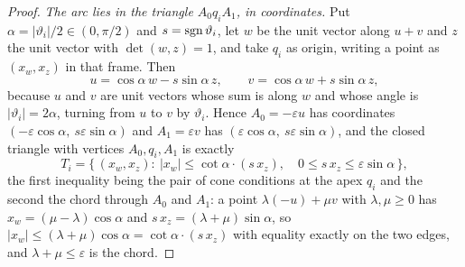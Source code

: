 \begin{proof}
\emph{The arc lies in the triangle $A_0q_iA_1$, in coordinates.} Put
$\alpha=|\vartheta_i|/2\in(0,\pi/2)$ and $s=\operatorname{sgn}\vartheta_i$, let $w$ be the unit vector
along $u+v$ and $z$ the unit vector with $\det(w,z)=1$, and take $q_i$ as
origin, writing a point as $(x_w,x_z)$ in that frame. Then
\[
   u=\cos\alpha\,w-s\sin\alpha\,z,
   \qquad
   v=\cos\alpha\,w+s\sin\alpha\,z,
\]
because $u$ and $v$ are unit vectors whose sum is along $w$ and whose angle is
$|\vartheta_i|=2\alpha$, turning from $u$ to $v$ by $\vartheta_i$. Hence
$A_0=-\varepsilon u$ has coordinates $(-\varepsilon\cos\alpha,\ s\varepsilon
\sin\alpha)$ and $A_1=\varepsilon v$ has $(\varepsilon\cos\alpha,\
s\varepsilon\sin\alpha)$, and the closed triangle with vertices $A_0,q_i,A_1$
is exactly
\begin{equation}
   T_i=\bigl\{\,(x_w,x_z):\ |x_w|\leq\cot\alpha\cdot(s\,x_z),
   \quad 0\leq s\,x_z\leq\varepsilon\sin\alpha\,\bigr\},
\label{cf:eq-triangle}
\end{equation}
the first inequality being the pair of cone conditions at the apex $q_i$ and the
second the chord through $A_0$ and $A_1$: a point $\lambda(-u)+\mu v$ with
$\lambda,\mu\geq0$ has $x_w=(\mu-\lambda)\cos\alpha$ and
$s\,x_z=(\lambda+\mu)\sin\alpha$, so $|x_w|\leq(\lambda+\mu)\cos\alpha=\cot\alpha
\cdot(s\,x_z)$ with equality exactly on the two edges, and $\lambda+\mu\leq
\varepsilon$ is the chord.


\end{proof}
